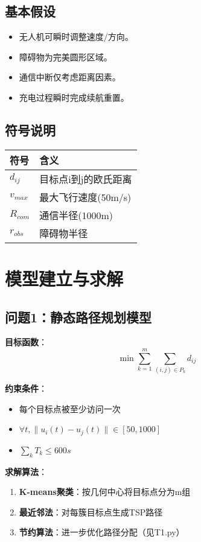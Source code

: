 \documentclass[12pt,fontset=adobe]{ctexart}
\begin{document}
\subsection{基本假设}
\begin{itemize}
    \item 无人机可瞬时调整速度/方向。
    \item 障碍物为完美圆形区域。
    \item 通信中断仅考虑距离因素。
    \item 充电过程瞬时完成续航重置。
\end{itemize}

\subsection{符号说明}
\begin{tabular}{ll}
\hline
符号 & 含义 \\
\hline
$d_{ij}$ & 目标点i到j的欧氏距离 \\
$v_{max}$ & 最大飞行速度(50m/s) \\
$R_{com}$ & 通信半径(1000m) \\
$r_{obs}$ & 障碍物半径 \\
\hline
\end{tabular}

\section{模型建立与求解}

\subsection{问题1：静态路径规划模型}

\textbf{目标函数}：
\begin{equation}
\min \sum_{k=1}^m \sum_{(i,j)\in P_k} d_{ij}
\end{equation}

\textbf{约束条件}：
\begin{itemize}
    \item 每个目标点被至少访问一次
    \item $\forall t, \|u_i(t)-u_j(t)\| \in [50,1000]$
    \item $\sum_{k} T_k \leq 600s$
\end{itemize}

\textbf{求解算法}：
\begin{enumerate}
    \item \textbf{K-means聚类}：按几何中心将目标点分为m组
    \item \textbf{最近邻法}：对每簇目标点生成TSP路径
    \item \textbf{节约算法}：进一步优化路径分配（见T1.py）
\end{enumerate}
\end{document}
